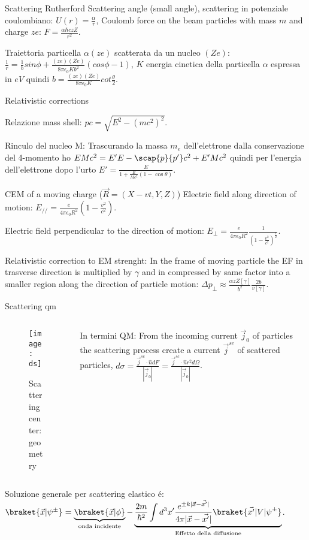 \begin{wordonframe}{Scattering Rutherford}
 Scattering angle (small angle), scattering in potenziale coulombiano:
$U(r)=\frac{\alpha}{r}$, Coulomb force on the beam particles with mass $m$ and charge $ze$: $F=\frac{\alpha \hbar c zZ}{r^2}$.

Traiettoria particella $\alpha (ze)$ scatterata da un nucleo $(Ze)$:
$\frac{1}{r}=\frac{1}{b}sin{\phi}+\frac{(ze)(Ze)}{8 \pi \epsilon_0Kb^2}(cos{\phi}-1)$, $K$ energia cinetica della particella $\alpha$ espressa in $eV$ quindi $b=\frac{(ze)(Ze)}{8 \pi \epsilon_0K}cot{\frac{\theta}{2}}$.

\end{wordonframe}

\begin{wordonframe}{Relativistic corrections}

Relazione mass shell: $pc=\sqrt{E^2-(mc^2)^2}$.

Rinculo del nucleo M:
Trascurando la massa $m_e$ dell'elettrone dalla conservazione del 4-momento ho $EMc^2=E'E-\scap{p}{p'}c^2+E'Mc^2$ quindi per l'energia dell'elettrone dopo l'urto $E'=\frac{E}{1+\frac{E}{Mc^2}(1-\cos{\theta})}$.

CEM of a moving charge ($\vec{R}=(X-vt,Y,Z)$) Electric field along direction of motion: $E_{//}=\frac{e}{4\pi\epsilon_0R^2}(1-\frac{v^2}{c^2})$.

Electric field perpendicular to the direction of motion: $E_{\perp}=\frac{e}{4\pi\epsilon_0R^2}\frac{1}{(1-\frac{v^2}{c^2})^{\frac{1}{2}}}$.

Relativistic correction to EM strenght: In the frame of moving particle the EF in trasverse direction is multiplied by $\gamma$ and in compressed by same factor into a smaller region along the direction of particle motion: $\Delta p_{\perp}\approx\frac{\alpha zZ[\gamma]}{b^2}\frac{2b}{v[\gamma]}$.
\end{wordonframe}


\begin{frame}{Scattering qm}
    \begin{columns}[T]
\begin{column}{0.5\textwidth}
\begin{figure}
    \centering
    \texttt{[image: ds]}
    \caption{Scattering center: geometry}
    \label{fig:scatgeom}
\end{figure}
\end{column}
\begin{column}{0.5\textwidth}
In termini QM: From the incoming current $\vec{j}_0$ of particles the scattering process create a current $\vec{j}^{sc}$ of scattered particles, $d\sigma=\frac{\vec{j}^{sc}\cdot\hat{n}dF}{|\vec{j}_0|}=\frac{\vec{j}^{sc}\cdot\hat{n}r^2d\Omega}{|\vec{j}_0|}$.
\end{column}
\end{columns}
Soluzione generale per scattering elastico \'e:
 $\braket{\vec{x}|\psi^{\pm}}=\underbrace{\braket{\vec{x}|\phi}}_{\text{onda incidente}}-\underbrace{\frac{2m}{\hbar^2}\int d^3x'\frac{e^{\pm k|\vec{x}-\vec{x'}|}}{4\pi|\vec{x}-\vec{x'}|}\braket{\vec{x'}|V|\psi^{\pm}}}_{\text{Effetto della diffusione}}$.
\end{frame}

